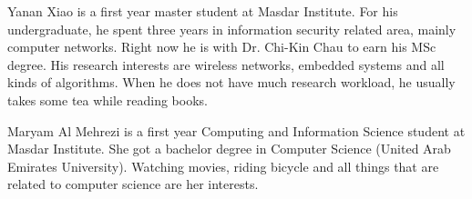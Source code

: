 \documentclass[12pt,journal,compsoc]{IEEEtran}
\begin{document}

\begin{IEEEbiographynophoto}{Yanan Xiao}
is a first year master student at Masdar Institute. For his undergraduate, he spent three years in information security related area, mainly computer networks. Right now he is with Dr. Chi-Kin Chau to earn his MSc degree. His research interests are wireless networks, embedded systems and all kinds of algorithms. When he does not have much research workload, he usually takes some tea while reading books.
\end{IEEEbiographynophoto}

\begin{IEEEbiographynophoto}{Maryam Al Mehrezi}
is a first year Computing and Information Science student at Masdar
Institute. She  got a bachelor degree in Computer Science (United Arab
Emirates University). Watching movies, riding bicycle and  all things
that are related to computer science are her interests. 
\end{IEEEbiographynophoto}


\vfill







\end{document}
